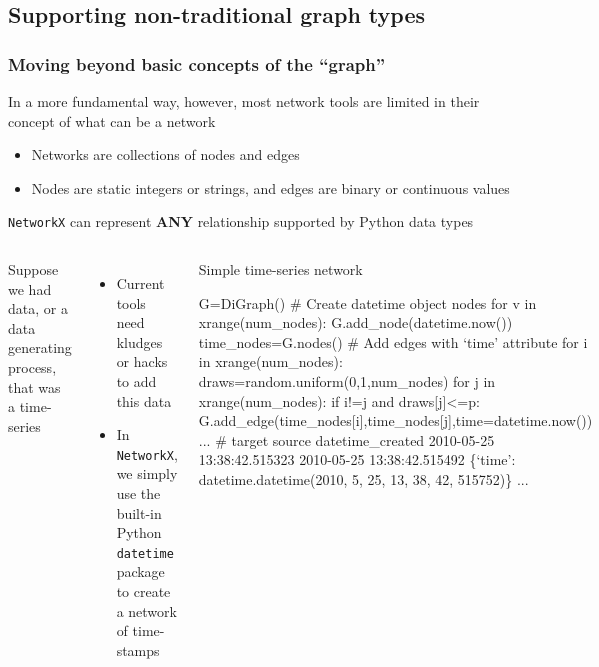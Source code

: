 \documentclass[xcolor=dvipsnames, 9pt]{beamer}
\newenvironment{code}{\begin{semiverbatim} \begin{footnotesize}}
{\end{footnotesize}\end{semiverbatim}}
\begin{document}

\subsection{Supporting non-traditional graph types} %
\label{sub:supporting_non_traditional_graph_types}

\begin{frame}[fragile]
    \frametitle{Moving beyond basic concepts of the ``graph''}
    In a more fundamental way, however, most network tools are limited in their concept of what can be a network
    \begin{itemize}
        \item Networks are collections of nodes and edges
        \item Nodes are static integers or strings, and edges are binary or continuous values
    \end{itemize}
    \texttt{NetworkX} can represent \textbf{ANY} relationship supported by Python data types
    \vspace{2mm}
    \begin{columns}
        \small{Suppose we had data, or a data generating process, that was a time-series
        \begin{itemize}
            \item Current tools need kludges or hacks to add this data
            \item In \texttt{NetworkX}, we simply use the built-in Python \texttt{datetime} package to create a network of time-stamps
        \end{itemize}}
        \begin{block}{\scriptsize{Simple time-series network}}
            \begin{code}
\tiny{G=DiGraph()
\alert<2>{# Create datetime object nodes}
for v in xrange(num_nodes):
    G.add_node(datetime.now())
time_nodes=G.nodes()
\alert<3>{# Add edges with `time' attribute}
for i in xrange(num_nodes):
    draws=random.uniform(0,1,num_nodes)
    for j in xrange(num_nodes):
        if i!=j and draws[j]<=p:
            G.add_edge(time_nodes[i],time_nodes[j],time=datetime.now())
...
\alert<4>{# target source datetime_created}
2010-05-25 13:38:42.515323 2010-05-25 13:38:42.515492 
    \{`time': datetime.datetime(2010, 5, 25, 13, 38, 42, 515752)\}
...}
                \end{code}
            \end{block}
    \end{columns}
\end{frame}
\end{document}
